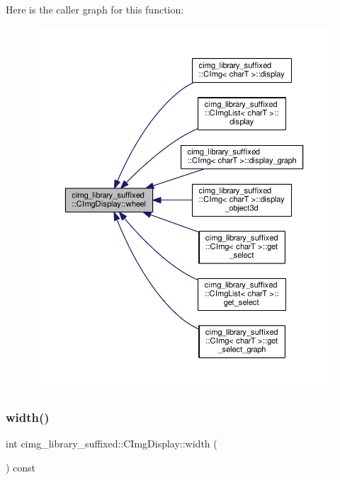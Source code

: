 Here is the caller graph for this function\+:
\nopagebreak
\begin{figure}[H]
\begin{center}
\leavevmode
\includegraphics[width=350pt]{d5/d53/structcimg__library__suffixed_1_1CImgDisplay_a652c48e6e55a89bc96c9ae24c99a828e_icgraph}
\end{center}
\end{figure}
\mbox{\label{structcimg__library__suffixed_1_1CImgDisplay_a7b08f09ace9b615eee0ff19846c4b6f8}} 
\subsubsection{\texorpdfstring{width()}{width()}}
{\footnotesize\ttfamily int cimg\+\_\+library\+\_\+suffixed\+::\+C\+Img\+Display\+::width (\begin{DoxyParamCaption}{ }\end{DoxyParamCaption}) const\hspace{0.3cm}{\ttfamily [inline]}}



